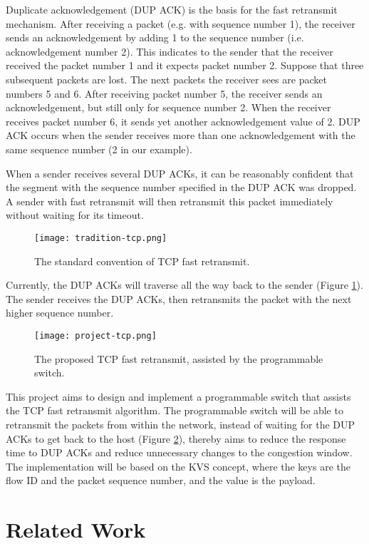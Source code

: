 Duplicate acknowledgement (DUP ACK) is the basis for the fast retransmit mechanism. After receiving a packet (e.g. with sequence number 1), the receiver sends an acknowledgement by adding 1 to the sequence number (i.e. acknowledgement number 2). This indicates to the sender that the receiver received the packet number 1 and it expects packet number 2. Suppose that three subsequent packets are lost. The next packets the receiver sees are packet numbers 5 and 6. After receiving packet number 5, the receiver sends an acknowledgement, but still only for sequence number 2. When the receiver receives packet number 6, it sends yet another acknowledgement value of 2. DUP ACK occurs when the sender receives more than one acknowledgement with the same sequence number (2 in our example).

When a sender receives several DUP ACKs, it can be reasonably confident that the segment with the sequence number specified in the DUP ACK was dropped. A sender with fast retransmit will then retransmit this packet immediately without waiting for its timeout.

\begin{figure}[h]
	\centering
	\texttt{[image: tradition-tcp.png]}
	\caption{The standard convention of TCP fast retransmit.}
	\label{tradition-tcp}
\end{figure}

Currently, the DUP ACKs will traverse all the way back to the sender (Figure \ref{tradition-tcp}). The sender receives the DUP ACKs, then retransmits the packet with the next higher sequence number. 

\begin{figure}[h]
	\centering
	\texttt{[image: project-tcp.png]}
	\caption{The proposed TCP fast retransmit, assisted by the programmable switch.}
	\label{project-tcp}
\end{figure}

This project aims to design and implement a programmable switch that assists the TCP fast retransmit algorithm. The programmable switch will be able to retransmit the packets from within the network, instead of waiting for the DUP ACKs to get back to the host (Figure \ref{project-tcp}), thereby aims to reduce the response time to DUP ACKs and reduce unnecessary changes to the congestion window. The implementation will be based on the KVS concept, where the keys are the flow ID and the packet sequence number, and the value is the payload.

\section{Related Work}

